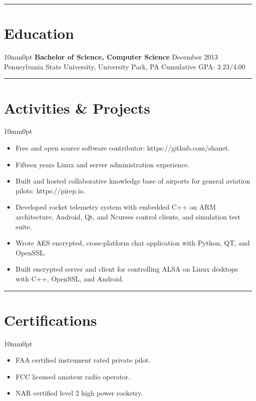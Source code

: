 \documentclass[letterpaper]{article}
\newcommand{\sectionrule}[1] {
  \noindent\rule{\textwidth}{.1mm}
  \vspace{-11mm}
  \section{#1}
}
\newenvironment{indentsection}
  {\begin{adjustwidth}{10mm}{0pt}}
  {\end{adjustwidth}}
\begin{document}
  \sectionrule{Education}

  \begin{indentsection}
    \textbf{Bachelor of Science, Computer Science} \hfill December 2013\\
    Pennsylvania State University, University Park, PA \hfill Cumulative GPA: 3.23/4.00
  \end{indentsection}

  \sectionrule{Activities \& Projects}

  \begin{indentsection}
    \begin{itemize}
      \item Free and open source software contributor: https://github.com/shanet.
      \item Fifteen years Linux and server administration experience.
      \item Built and hosted collaborative knowledge base of airports for general aviation pilots: https://pirep.io.
      \item Developed rocket telemetry system with embedded C++ on ARM architecture, Android, Qt, and Ncurses control clients, and simulation test suite.
      \item Wrote AES encrypted, cross-platform chat application with Python, QT, and OpenSSL.
      \item Built encrypted server and client for controlling ALSA on Linux desktops with C++, OpenSSL, and Android.
    \end{itemize}
  \end{indentsection}

  \sectionrule{Certifications}

  \begin{indentsection}
    \begin{itemize}
      \item FAA certified instrument rated private pilot.
      \item FCC licensed amateur radio operator.
      \item NAR certified level 2 high power rocketry.
    \end{itemize}
  \end{indentsection}
\end{document}
